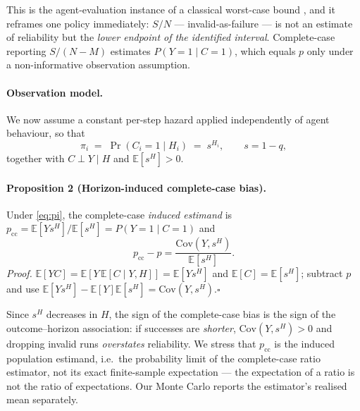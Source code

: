 \documentclass[letterpaper]{article}
\begin{document}
This is the agent-evaluation instance of a classical worst-case bound
\citep{manski1990nonparametric}, and it reframes one policy immediately:
$S/N$ --- invalid-as-failure --- is not an estimate of reliability but the
\emph{lower endpoint of the identified interval}. Complete-case reporting
$S/(N-M)$ estimates $P(Y=1\mid C=1)$, which equals $p$ only under a
non-informative observation assumption.

\paragraph{Observation model.} We now assume a constant per-step hazard applied
independently of agent behaviour, so that
\begin{equation}
\pi_i \;=\; \Pr(C_i=1\mid H_i)\;=\;s^{H_i},\qquad s=1-q,
\label{eq:pi}
\end{equation}
together with $C\perp Y\mid H$ and $\mathbb{E}[s^{H}]>0$.

\paragraph{Proposition 2 (Horizon-induced complete-case bias).}
Under \eqref{eq:pi}, the complete-case \emph{induced estimand} is
$p_{\mathrm{cc}}=\mathbb{E}[Ys^{H}]/\mathbb{E}[s^{H}]=P(Y{=}1\mid C{=}1)$ and
\begin{equation}
p_{\mathrm{cc}}-p=\frac{\mathrm{Cov}(Y,s^{H})}{\mathbb{E}[s^{H}]} .
\label{eq:cc}
\end{equation}
\emph{Proof.} $\mathbb{E}[YC]=\mathbb{E}[Y\,\mathbb{E}[C\mid Y,H]]=\mathbb{E}[Ys^{H}]$
and $\mathbb{E}[C]=\mathbb{E}[s^{H}]$; subtract $p$ and use
$\mathbb{E}[Ys^{H}]-\mathbb{E}[Y]\mathbb{E}[s^{H}]=\mathrm{Cov}(Y,s^{H})$.\hfill$\square$

Since $s^{H}$ decreases in $H$, the sign of the complete-case bias is the sign
of the outcome--horizon association: if successes are \emph{shorter},
$\mathrm{Cov}(Y,s^{H})>0$ and dropping invalid runs \emph{overstates}
reliability. We stress that $p_{\mathrm{cc}}$ is the induced population
estimand, i.e.\ the probability limit of the complete-case ratio estimator, not
its exact finite-sample expectation --- the expectation of a ratio is not the
ratio of expectations. Our Monte Carlo reports the estimator's realised mean
separately.
\end{document}
